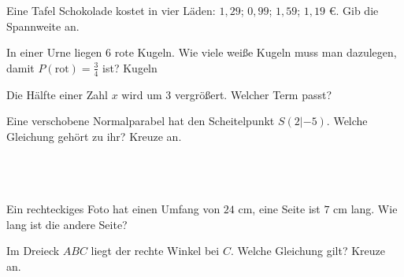 \documentclass[11pt]{article}
\begin{document}
\noindent\begin{minipage}[t]{0.485\linewidth}\raggedright
\begin{aufgabe}{Eine Tafel Schokolade kostet in vier Läden: $1{,}29$; $0{,}99$; $1{,}59$; $1{,}19$ €. Gib die Spannweite an. \leerfeld[€]}
\end{aufgabe}
\end{minipage}\hfill\begin{minipage}[t]{0.485\linewidth}\raggedright
\begin{aufgabe}{In einer Urne liegen $6$ rote Kugeln. Wie viele weiße Kugeln muss man dazulegen, damit $P(\text{rot}) = \frac{3}{4}$ ist? \leerfeld Kugeln}
\end{aufgabe}
\end{minipage}\par

\begin{aufgabe}{Die Hälfte einer Zahl $x$ wird um 3 vergrößert. Welcher Term passt? \\    }
\end{aufgabe}

\begin{aufgabe}{Eine verschobene Normalparabel hat den Scheitelpunkt $S(2|-5)$. Welche Gleichung gehört zu ihr? Kreuze an.\\ \\ \\ \\ }
\end{aufgabe}

\begin{aufgabe}{Ein rechteckiges Foto hat einen Umfang von $24$ cm, eine Seite ist $7$ cm lang. Wie lang ist die andere Seite? \leerfeld[cm]}
\end{aufgabe}

\begin{aufgabe}{Im Dreieck $ABC$ liegt der rechte Winkel bei $C$. Welche Gleichung gilt? Kreuze an. \\   }
\end{aufgabe}
\end{document}
